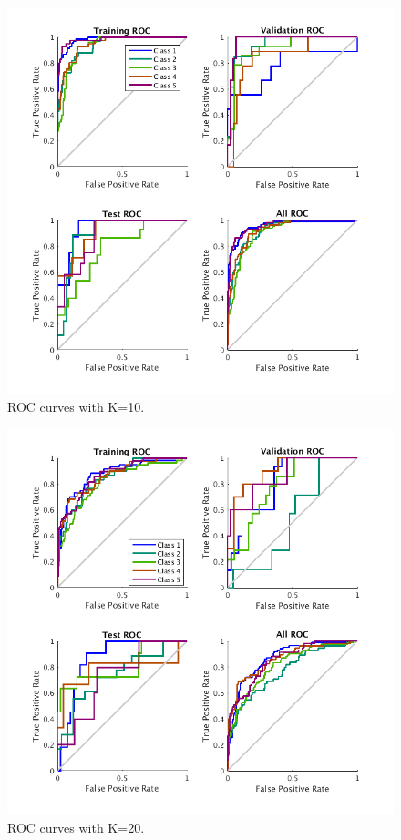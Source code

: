 \documentclass{article}
\begin{document}
\begin{figure}[h]
\centering
\includegraphics[scale=0.5]{Figures/Metrics/roc_k10}
\caption{ROC curves with K=10.}
\label{fig:r10}
\end{figure}
\begin{figure}[h]
\centering
\includegraphics[scale=0.5]{Figures/Metrics/roc_k20}
\caption{ROC curves with K=20.}
\label{fig:r20}
\end{figure}
\end{document}
